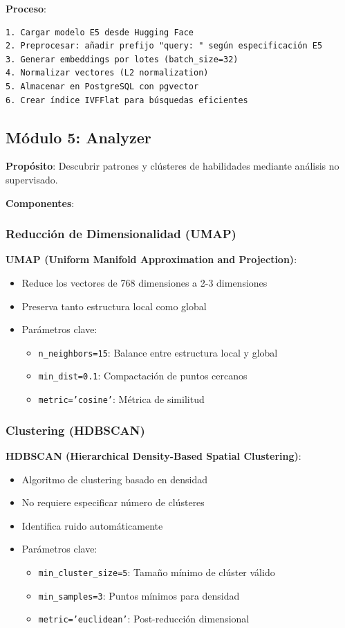 \textbf{Proceso}:
\begin{verbatim}
1. Cargar modelo E5 desde Hugging Face
2. Preprocesar: añadir prefijo "query: " según especificación E5
3. Generar embeddings por lotes (batch_size=32)
4. Normalizar vectores (L2 normalization)
5. Almacenar en PostgreSQL con pgvector
6. Crear índice IVFFlat para búsquedas eficientes
\end{verbatim}

\subsection{Módulo 5: Analyzer}

\textbf{Propósito}: Descubrir patrones y clústeres de habilidades mediante análisis no supervisado.

\textbf{Componentes}:

\subsubsection{Reducción de Dimensionalidad (UMAP)}

\textbf{UMAP (Uniform Manifold Approximation and Projection)}:
\begin{itemize}
    \item Reduce los vectores de 768 dimensiones a 2-3 dimensiones
    \item Preserva tanto estructura local como global
    \item Parámetros clave:
    \begin{itemize}
        \item \texttt{n\_neighbors=15}: Balance entre estructura local y global
        \item \texttt{min\_dist=0.1}: Compactación de puntos cercanos
        \item \texttt{metric='cosine'}: Métrica de similitud
    \end{itemize}
\end{itemize}

\subsubsection{Clustering (HDBSCAN)}

\textbf{HDBSCAN (Hierarchical Density-Based Spatial Clustering)}:
\begin{itemize}
    \item Algoritmo de clustering basado en densidad
    \item No requiere especificar número de clústeres
    \item Identifica ruido automáticamente
    \item Parámetros clave:
    \begin{itemize}
        \item \texttt{min\_cluster\_size=5}: Tamaño mínimo de clúster válido
        \item \texttt{min\_samples=3}: Puntos mínimos para densidad
        \item \texttt{metric='euclidean'}: Post-reducción dimensional
    \end{itemize}
\end{itemize}

